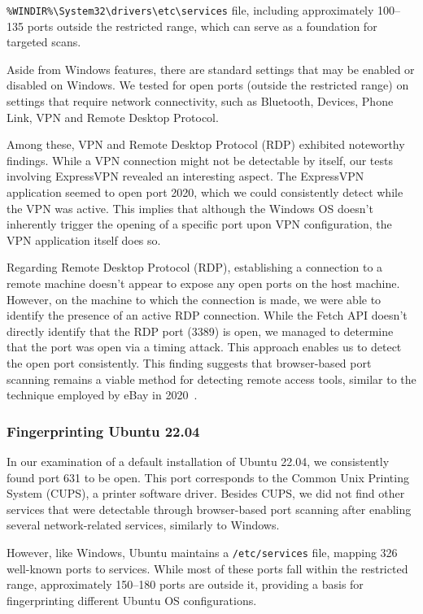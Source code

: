 \texttt{\%WINDIR\%\textbackslash System32\textbackslash drivers\textbackslash etc\textbackslash services} file, including approximately 100–135 ports outside the restricted range, which can serve as a foundation for targeted scans.

Aside from Windows features, there are standard settings that may be enabled or disabled on Windows. We tested for open ports (outside the restricted range) on settings that require network connectivity, such as Bluetooth, Devices, Phone Link, VPN and Remote Desktop Protocol.

Among these, VPN and Remote Desktop Protocol (RDP) exhibited noteworthy findings. While a VPN connection might not be detectable by itself, our tests involving ExpressVPN revealed an interesting aspect. The ExpressVPN application seemed to open port 2020, which we could consistently detect while the VPN was active. This implies that although the Windows OS doesn't inherently trigger the opening of a specific port upon VPN configuration, the VPN application itself does so.

Regarding Remote Desktop Protocol (RDP), establishing a connection to a remote machine doesn't appear to expose any open ports on the host machine. However, on the machine to which the connection is made, we were able to identify the presence of an active RDP connection. While the Fetch API doesn't directly identify that the RDP port (3389) is open, we managed to determine that the port was open via a timing attack. This approach enables us to detect the open port consistently. This finding suggests that browser-based port scanning remains a viable method for detecting remote access tools, similar to the technique employed by eBay in 2020~\cite{ebay_port_scans}.

\subsubsection{Fingerprinting Ubuntu 22.04}

In our examination of a default installation of Ubuntu 22.04, we consistently found port 631 to be open. This port corresponds to the Common Unix Printing System (CUPS), a printer software driver.
Besides CUPS, we did not find other services that were detectable through browser-based port scanning after enabling several network-related services, similarly to Windows.

However, like Windows, Ubuntu maintains a \texttt{/etc/services} file, mapping 326 well-known ports to services. While most of these ports fall within the restricted range, approximately 150–180 ports are outside it, providing a basis for fingerprinting different Ubuntu OS configurations.

